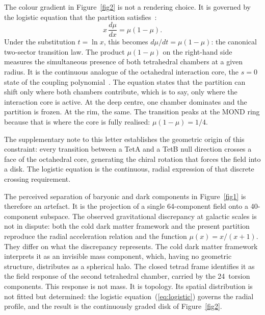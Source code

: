 \documentclass[twocolumn]{iopjournal}
\begin{document}
The colour gradient in Figure~\ref{fig2} is not a rendering
choice.  It is governed by the logistic equation that the
partition satisfies~\cite{Nelson2026b}:
\begin{equation}
  x\,\frac{d\mu}{dx} = \mu(1 - \mu).
  \label{eq:logistic}
\end{equation}
Under the substitution $t = \ln x$, this becomes
$d\mu/dt = \mu(1-\mu)$: the canonical two-sector transition
law.  The product $\mu(1-\mu)$ on the right-hand side measures
the simultaneous presence of both tetrahedral chambers at a
given radius.  It is the continuous analogue of the octahedral
interaction core, the $s = 0$ state of the coupling
polynomial~\cite{Nelson2026b}.  The equation states that the
partition can shift only where both chambers contribute, which
is to say, only where the interaction core is active.  At the
deep centre, one chamber dominates and the partition is frozen.
At the rim, the same.  The transition peaks at the MOND ring
because that is where the core is fully realised:
$\mu(1 - \mu) = 1/4$.

The supplementary note to this letter establishes the
geometric origin of this constraint: every transition between
a TetA and a TetB null direction crosses a face of the
octahedral core, generating the chiral rotation that forces
the field into a disk.  The logistic equation is the
continuous, radial expression of that discrete crossing
requirement.

The perceived separation of baryonic and dark components in
Figure~\ref{fig1} is therefore an artefact.  It is the
projection of a single 64-component field onto a 40-component
subspace.  The observed gravitational discrepancy at galactic
scales is not in dispute: both the cold dark matter framework
and the present partition reproduce the radial acceleration
relation and the function $\mu(x) = x/(x{+}1)$.  They differ
on what the discrepancy represents.  The cold dark matter
framework interprets it as an invisible mass component, which,
having no geometric structure, distributes as a spherical
halo.  The closed tetrad frame identifies it as the field
response of the second tetrahedral chamber, carried by the
24~torsion components.  This response is not mass.  It is
topology.  Its spatial distribution is not fitted but
determined: the logistic equation~(\ref{eq:logistic}) governs
the radial profile, and the result is the continuously graded
disk of Figure~\ref{fig2}.

\end{document}
